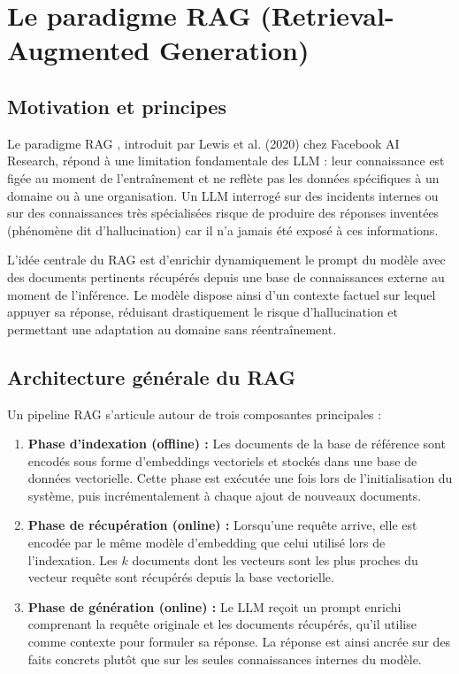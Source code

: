 \section{Le paradigme RAG (Retrieval-Augmented Generation)}

\subsection{Motivation et principes}

Le paradigme RAG \cite{logo:rag}, introduit par Lewis et al. (2020) chez Facebook AI Research, répond à une limitation fondamentale des LLM : leur connaissance est figée au moment de l'entraînement et ne reflète pas les données spécifiques à un domaine ou à une organisation. Un LLM interrogé sur des incidents internes ou sur des connaissances très spécialisées risque de produire des réponses inventées (phénomène dit d'hallucination) car il n'a jamais été exposé à ces informations.

L'idée centrale du RAG est d'enrichir dynamiquement le prompt du modèle avec des documents pertinents récupérés depuis une base de connaissances externe au moment de l'inférence. Le modèle dispose ainsi d'un contexte factuel sur lequel appuyer sa réponse, réduisant drastiquement le risque d'hallucination et permettant une adaptation au domaine sans réentraînement.

\subsection{Architecture générale du RAG}

Un pipeline RAG s'articule autour de trois composantes principales :

\begin{enumerate}
    \item \textbf{Phase d'indexation (offline) :} Les documents de la base de référence sont encodés sous forme d'embeddings vectoriels et stockés dans une base de données vectorielle. Cette phase est exécutée une fois lors de l'initialisation du système, puis incrémentalement à chaque ajout de nouveaux documents.

    \item \textbf{Phase de récupération (online) :} Lorsqu'une requête arrive, elle est encodée par le même modèle d'embedding que celui utilisé lors de l'indexation. Les $k$ documents dont les vecteurs sont les plus proches du vecteur requête sont récupérés depuis la base vectorielle.

    \item \textbf{Phase de génération (online) :} Le LLM reçoit un prompt enrichi comprenant la requête originale et les documents récupérés, qu'il utilise comme contexte pour formuler sa réponse. La réponse est ainsi ancrée sur des faits concrets plutôt que sur les seules connaissances internes du modèle.
\end{enumerate}

